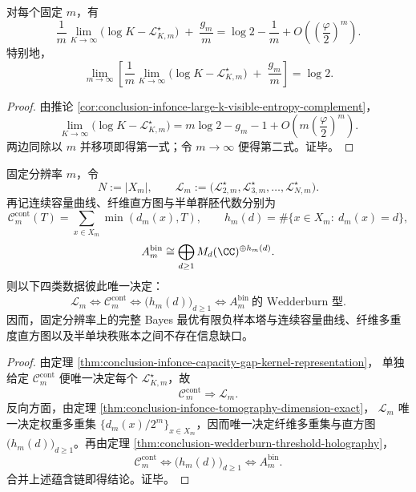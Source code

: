 \begin{corollary}\label{cor:conclusion-infonce-large-k-gauge-rate-complement}
对每个固定 \(m\)，有
\[
\frac1m\lim_{K\to\infty}\bigl(\log K-\mathcal L_{K,m}^\star\bigr)
\;+\;
\frac{g_m}{m}
=
\log 2-\frac1m+O\!\left(\left(\frac{\varphi}{2}\right)^m\right).
\]
特别地，
\[
\lim_{m\to\infty}
\left[
\frac1m\lim_{K\to\infty}\bigl(\log K-\mathcal L_{K,m}^\star\bigr)
\;+\;
\frac{g_m}{m}
\right]
=
\log 2.
\]
\end{corollary}

\begin{proof}
由推论 \ref{cor:conclusion-infonce-large-k-visible-entropy-complement}，
\[
\lim_{K\to\infty}\bigl(\log K-\mathcal L_{K,m}^\star\bigr)
=
m\log 2-g_m-1+O\!\left(m\left(\frac{\varphi}{2}\right)^m\right).
\]
两边同除以 \(m\) 并移项即得第一式；令 \(m\to\infty\) 便得第二式。证毕。
\end{proof}

\begin{theorem}\label{thm:conclusion-infonce-capacity-wedderburn-unified-closure}
固定分辨率 \(m\)，令
\[
N:=|X_m|,
\qquad
\mathscr L_m:=
\bigl(
\mathcal L_{2,m}^\star,\mathcal L_{3,m}^\star,\dots,\mathcal L_{N,m}^\star
\bigr).
\]
再记连续容量曲线、纤维直方图与半单群胚代数分别为
\[
\mathcal C_m^{\mathrm{cont}}(T)=\sum_{x\in X_m}\min(d_m(x),T),
\qquad
h_m(d)=\#\{x\in X_m:\ d_m(x)=d\},
\]
\[
A_m^{\mathrm{bin}}\cong \bigoplus_{d\ge 1}M_d(\CC)^{\oplus h_m(d)}.
\]
则以下四类数据彼此唯一决定：
\[
\mathscr L_m
\Longleftrightarrow
\mathcal C_m^{\mathrm{cont}}
\Longleftrightarrow
\bigl(h_m(d)\bigr)_{d\ge 1}
\Longleftrightarrow
A_m^{\mathrm{bin}}\ \text{的 Wedderburn 型}.
\]
因而，固定分辨率上的完整 Bayes 最优有限负样本塔与连续容量曲线、纤维多重度直方图以及半单块秩账本之间不存在信息缺口。
\end{theorem}

\begin{proof}
由定理 \ref{thm:conclusion-infonce-capacity-gap-kernel-representation}，
单独给定 \(\mathcal C_m^{\mathrm{cont}}\) 便唯一决定每个 \(\mathcal L_{K,m}^\star\)，故
\[
\mathcal C_m^{\mathrm{cont}}\Longrightarrow \mathscr L_m.
\]
反向方面，由定理 \ref{thm:conclusion-infonce-tomography-dimension-exact}，
\(\mathscr L_m\) 唯一决定权重多重集 \(\{d_m(x)/2^m\}_{x\in X_m}\)，因而唯一决定纤维多重集与直方图 \(\bigl(h_m(d)\bigr)_{d\ge1}\)。再由定理 \ref{thm:conclusion-wedderburn-threshold-holography}，
\[
\mathcal C_m^{\mathrm{cont}}
\Longleftrightarrow
\bigl(h_m(d)\bigr)_{d\ge1}
\Longleftrightarrow
A_m^{\mathrm{bin}}.
\]
合并上述蕴含链即得结论。证毕。
\end{proof}

